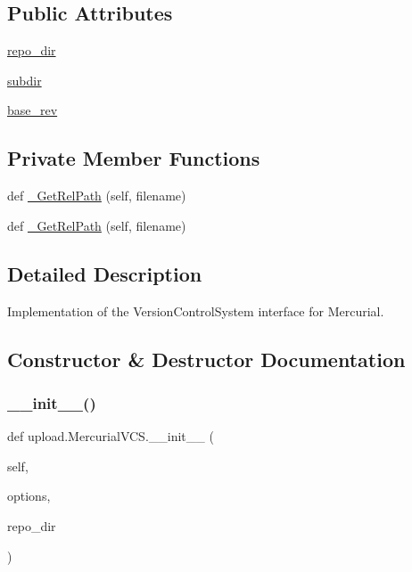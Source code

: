 \subsection*{Public Attributes}
\begin{DoxyCompactItemize}
\item 
\mbox{\hyperlink{classupload_1_1_mercurial_v_c_s_a219c1e0ab9ce864e3231913762ea489b}{repo\+\_\+dir}}
\item 
\mbox{\hyperlink{classupload_1_1_mercurial_v_c_s_a0dad32e621f5523e3430d867184f0b42}{subdir}}
\item 
\mbox{\hyperlink{classupload_1_1_mercurial_v_c_s_a41faae7820d5a015f4a42476e5e4ab8c}{base\+\_\+rev}}
\end{DoxyCompactItemize}
\subsection*{Private Member Functions}
\begin{DoxyCompactItemize}
\item 
def \mbox{\hyperlink{classupload_1_1_mercurial_v_c_s_a140da653b63106c4fa825f3ef5bf7701}{\+\_\+\+Get\+Rel\+Path}} (self, filename)
\item 
def \mbox{\hyperlink{classupload_1_1_mercurial_v_c_s_a140da653b63106c4fa825f3ef5bf7701}{\+\_\+\+Get\+Rel\+Path}} (self, filename)
\end{DoxyCompactItemize}


\subsection{Detailed Description}
\begin{DoxyVerb}Implementation of the VersionControlSystem interface for Mercurial.\end{DoxyVerb}
 

\subsection{Constructor \& Destructor Documentation}
\mbox{\label{classupload_1_1_mercurial_v_c_s_a33890f442dedbb7d9fd45c08b5baed56}} 
\subsubsection{\texorpdfstring{\_\_init\_\_()}{\_\_init\_\_()}\hspace{0.1cm}{\footnotesize\ttfamily [1/2]}}
{\footnotesize\ttfamily def upload.\+Mercurial\+V\+C\+S.\+\_\+\+\_\+init\+\_\+\+\_\+ (\begin{DoxyParamCaption}\item[{}]{self,  }\item[{}]{options,  }\item[{}]{repo\+\_\+dir }\end{DoxyParamCaption})}

